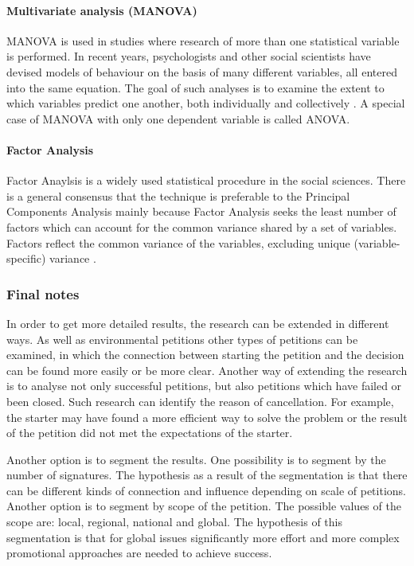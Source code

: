 \paragraph{Multivariate analysis (MANOVA)} MANOVA is used in studies where research of more than one statistical variable is performed. In recent years, psychologists and other social scientists have devised models of behaviour on the basis of many different variables, all entered into the same equation. The goal of such analyses is to examine the extent to which variables predict one another, both individually and collectively \citep{GilesD2003}. A special case of MANOVA with only one dependent variable is called ANOVA.

\paragraph{Factor Analysis} Factor Anaylsis is a widely used statistical procedure in the social sciences. There is a general consensus that the technique is preferable to the Principal Components Analysis mainly because Factor Analysis seeks the least number of factors which can account for the common variance shared by a set of variables. Factors reflect the common variance of the variables, excluding unique (variable-specific) variance \citep{Krishnan2011}.

\subsubsection{Final notes}
In order to get more detailed results, the research can be extended in different ways. As well as environmental petitions other types of petitions can be examined, in which the connection between starting the petition and the decision can be found more easily or be more clear. Another way of extending the research is to analyse not only successful petitions, but also petitions which have failed or been closed. Such research can identify the reason of cancellation. For example, the starter may have found a more efficient way to solve the problem or the result of the petition did not met the expectations of the starter.\par\vspace{0.2cm}

Another option is to segment the results. One possibility is to segment by the number of signatures. The hypothesis as a result of the segmentation is that there can be different kinds of connection and influence depending on scale of petitions. Another option is to segment by scope of the petition. The possible values of the scope are: local, regional, national and global. The hypothesis of this segmentation is that for global issues significantly more effort and more complex promotional approaches are needed to achieve success.

